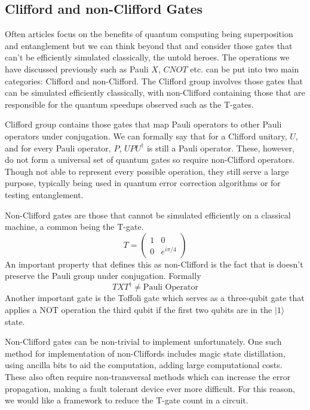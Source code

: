 \documentclass[12pt]{article}
\newcommand{\newp}
    {
    \vskip 0.5cm 
  }
\numberwithin{equation}{section}
\begin{document}
\subsection{Clifford and non-Clifford Gates}
Often articles focus on the benefits of quantum computing being superposition 
and entanglement but we can think beyond that and consider those gates that can't
be efficiently simulated classically, the untold heroes. 
The operations we have discussed previously such as Pauli $X$, $CNOT$ etc. can be put 
into two main categories: Clifford and non-Clifford. The Clifford group involves 
those gates that can be simulated efficiently classically, with non-Clifford 
containing those that are responsible for the quantum speedups observed such as 
the T-gates. 
\newp 
Clifford group contains those gates that map Pauli operators to other Pauli 
operators under conjugation. We can formally say that for a Clifford unitary, $U$, 
and for every Pauli operator, $P$, $UPU^{\dagger}$ is still a Pauli operator. 
These, however, do not form a universal set of quantum gates so require 
non-Clifford operators. Though not able to represent every possible operation,
they still serve a large purpose, typically being used in quantum error correction 
algorithms or for testing entanglement. 
\newp 
Non-Clifford gates are those that cannot be simulated efficiently on a classical 
machine, a common being the T-gate. 
\begin{equation}
  T = 
  \begin{pmatrix} 
1 & 0 \\ 
0 & e^{i\pi/4} 
\end{pmatrix} 
\end{equation}
An important property that defines this as non-Clifford is the fact that is doesn't 
preserve the Pauli group under conjugation. Formally 
\begin{equation}
  TXT^{\dagger} \neq \text{Pauli Operator}
\end{equation}
Another important gate is the Toffoli gate which serves as a three-qubit gate 
that applies a NOT operation the third qubit if the first two qubits are in the 
$|1\rangle$ state.
\newp 
Non-Clifford gates can be non-trivial to implement unfortunately. 
One such method for implementation of non-Cliffords includes magic state 
distillation, using ancilla bits to aid the computation, adding large computational 
costs. These also often require non-transversal methods which can increase the 
error propagation, making a fault tolerant device ever more difficult. For this 
reason, we would like a framework to reduce the T-gate count in a circuit.
\end{document}
